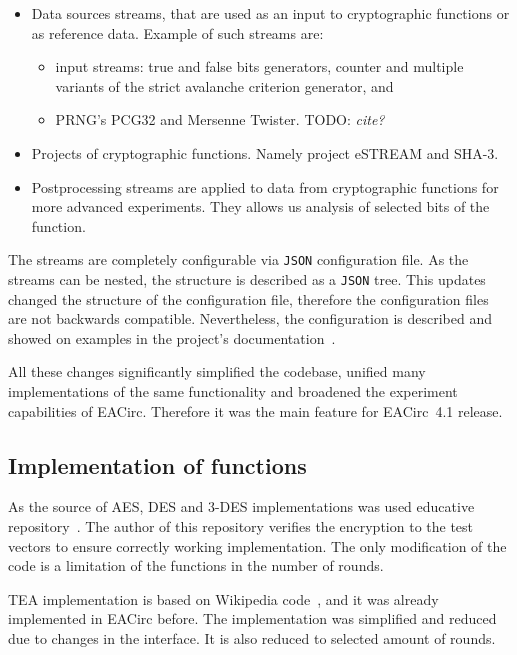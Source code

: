\documentclass[
  print, %
  Table,   %
  nolof,     %
  nolot,     %
  11pt, %
  oneside  %
]{fithesis3}
\newcommand{\todo}[1]{TODO: \textit{#1}}
\begin{document}
\begin{itemize}
    \item Data sources streams, that are used as an input to cryptographic functions or as reference data. Example of such streams are:
    \begin{itemize}
        \item input streams: true and false bits generators, counter and multiple variants of the strict avalanche criterion generator, and
        \item PRNG's PCG32 and Mersenne Twister. \todo{cite?}
    \end{itemize}
    \item Projects of cryptographic functions. Namely project eSTREAM and SHA-3.
    \item Postprocessing streams are applied to data from cryptographic functions for more advanced experiments. They allows us analysis of selected bits of the function.
\end{itemize}

The streams are completely configurable via \texttt{JSON} configuration file. As the streams can be nested, the structure is described as a \texttt{JSON} tree. This updates changed the structure of the configuration file, therefore the configuration files are not backwards compatible. Nevertheless, the configuration is described and showed on examples in the project's documentation~\cite{EACirc-wiki-streams}.

All these changes significantly simplified the codebase, unified many implementations of the same functionality and broadened the experiment capabilities of EACirc. Therefore it was the main feature for EACirc~4.1 release.

\subsection{Implementation of functions}
\label{subsec:method-data-funcs}

As the source of AES, DES and 3-DES implementations was used educative repository~\cite{cryptoFunc}. The author of this repository verifies the encryption to the test vectors to ensure correctly working implementation. The only modification of the code is a limitation of the functions in the number of rounds.

TEA implementation is based on Wikipedia code~\cite{teaWiki}, and it was already implemented in EACirc before. The implementation was simplified and reduced due to changes in the interface. It is also reduced to selected amount of rounds.
\end{document}
